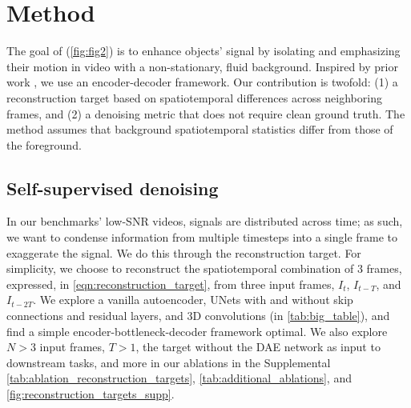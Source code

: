 \section{Method}\label{sec:method}

The goal of \NAME{} (\cref{fig:fig2}) is to enhance objects' signal by isolating and emphasizing their motion in video with a non-stationary, fluid background. Inspired by prior work \cite{sun2022bkind, jakab2018conditionalImageGen, ryou2021weaksupKPdisco}, we use an encoder-decoder framework. Our contribution is twofold: (1) a reconstruction target based on spatiotemporal differences across neighboring frames, and (2) a denoising metric that does not require clean ground truth. The method assumes that background spatiotemporal statistics differ from those of the foreground. 

\subsection{Self-supervised denoising}
In our benchmarks' low-SNR videos, signals are distributed across time; as such, we want to condense information from multiple timesteps into a single frame to exaggerate the signal. We do this through the reconstruction target. For simplicity, we choose to reconstruct the spatiotemporal combination of 3 frames, expressed, in \cref{eqn:reconstruction_target}, from three input frames, $I_t$, $I_{t-T}$, and $I_{t-2T}$. We explore a vanilla autoencoder, UNets with and without skip connections and residual layers, and 3D convolutions (in \cref{tab:big_table}), and find a simple encoder-bottleneck-decoder framework optimal. We also explore $N>3$ input frames, $T>1$, the target without the DAE network as input to downstream tasks, and more in our ablations in the Supplemental \cref{tab:ablation_reconstruction_targets}, \ref{tab:additional_ablations}, and \cref{fig:reconstruction_targets_supp}. 

